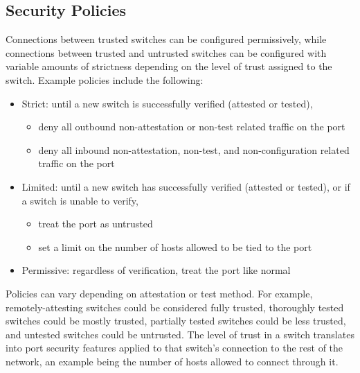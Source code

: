 \documentclass[journal]{IEEEtran}
\begin{document}
\subsection{Security Policies}\label{sec:policies}
Connections between trusted switches can be configured permissively, while connections between
trusted and untrusted switches can be configured with variable amounts of strictness depending on
the level of trust assigned to the switch. Example policies include the following:
\begin{itemize}
  \item Strict: until a new switch is successfully verified (attested or tested),
  \begin{itemize}
    \item deny all outbound non-attestation or non-test related traffic on the port
    \item deny all inbound non-attestation, non-test, and non-configuration related traffic on the
    port
  \end{itemize}
  \item Limited: until a new switch has successfully verified (attested or tested), or if a switch
  is unable to verify,
  \begin{itemize}
    \item treat the port as untrusted
    \item set a limit on the number of hosts allowed to be tied to the port
  \end{itemize}
  \item Permissive: regardless of verification, treat the port like normal
\end{itemize}

Policies can vary depending on attestation or test method. For example, remotely-attesting switches
could be considered fully trusted, thoroughly tested switches could be mostly trusted, partially
tested switches could be less trusted, and untested switches could be untrusted. The level of trust
in a switch translates into port security features applied to that switch's connection to the rest
of the network, an example being the number of hosts allowed to connect through it.

\end{document}
